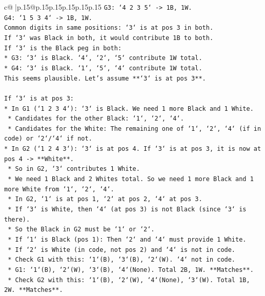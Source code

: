 \documentclass{article}
\begin{document}
{\begin{supertabular}{c@{$\;$}|p{.15\linewidth}@{}p{.15\linewidth}p{.15\linewidth}p{.15\linewidth}p{.15\linewidth}p{.15\linewidth}}
{{{\texttt{G3: `4 2 3 5` {-}> 1B, 1W.} \\
\texttt{G4: `1 5 3 4` {-}> 1B, 1W.} \\
\texttt{Common digits in same positions: `3` is at pos 3 in both.} \\
\texttt{If `3` was Black in both, it would contribute 1B to both.} \\
\texttt{If `3` is the Black peg in both:} \\
\texttt{*   G3: `3` is Black. `4`, `2`, `5` contribute 1W total.} \\
\texttt{*   G4: `3` is Black. `1`, `5`, `4` contribute 1W total.} \\
\texttt{This seems plausible. Let's assume **`3` is at pos 3**.} \\
\\ 
\texttt{If `3` is at pos 3:} \\
\texttt{*   In G1 (`1 2 3 4`): `3` is Black. We need 1 more Black and 1 White.} \\
\texttt{    *   Candidates for the other Black: `1`, `2`, `4`.} \\
\texttt{    *   Candidates for the White: The remaining one of `1`, `2`, `4` (if in code) or `2`/`4` if not.} \\
\texttt{*   In G2 (`1 2 4 3`): `3` is at pos 4. If `3` is at pos 3, it is now at pos 4 {-}> **White**.} \\
\texttt{    *   So in G2, `3` contributes 1 White.} \\
\texttt{    *   We need 1 Black and 2 Whites total. So we need 1 more Black and 1 more White from `1`, `2`, `4`.} \\
\texttt{    *   In G2, `1` is at pos 1, `2` at pos 2, `4` at pos 3.} \\
\texttt{    *   If `3` is White, then `4` (at pos 3) is not Black (since `3` is there).} \\
\texttt{    *   So the Black in G2 must be `1` or `2`.} \\
\texttt{    *   If `1` is Black (pos 1): Then `2` and `4` must provide 1 White.} \\
\texttt{        *   If `2` is White (in code, not pos 2) and `4` is not in code.} \\
\texttt{        *   Check G1 with this: `1`(B), `3`(B), `2`(W). `4` not in code.} \\
\texttt{            *   G1: `1`(B), `2`(W), `3`(B), `4`(None). Total 2B, 1W. **Matches**.} \\
\texttt{        *   Check G2 with this: `1`(B), `2`(W), `4`(None), `3`(W). Total 1B, 2W. **Matches**.} \\
}}}
\end{supertabular}}
\end{document}
